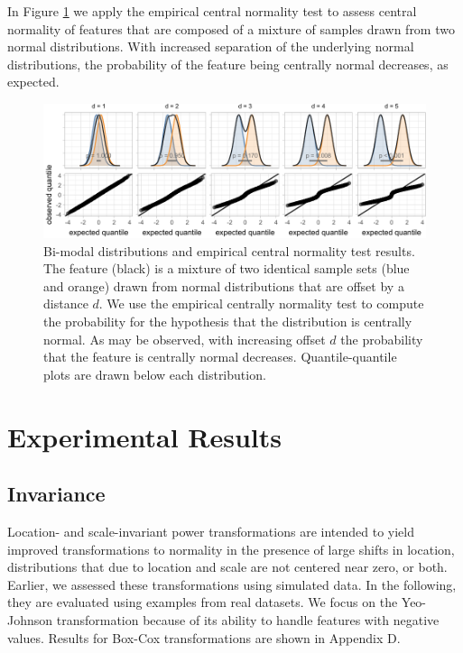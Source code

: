 \documentclass[
  a4paper,
]{article}
\begin{document}
In Figure \ref{fig:empirical-central-normality-examples} we apply the
empirical central normality test to assess central normality of features
that are composed of a mixture of samples drawn from two normal
distributions. With increased separation of the underlying normal
distributions, the probability of the feature being centrally normal
decreases, as expected.

\begin{figure}

{\centering \includegraphics{manuscript_files/figure-latex/empirical-central-normality-examples-1} 

}

\caption{Bi-modal distributions and empirical central normality test results. The feature (black) is a mixture of two identical sample sets (blue and orange) drawn from normal distributions that are offset by a distance $d$. We use the empirical centrally normality test to compute the probability for the hypothesis that the distribution is centrally normal. As may be observed, with increasing offset $d$ the probability that the feature is centrally normal decreases. Quantile-quantile plots are drawn below each distribution.}\label{fig:empirical-central-normality-examples}
\end{figure}

\section{Experimental Results}\label{experimental-results}

\subsection{Invariance}\label{invariance}

Location- and scale-invariant power transformations are intended to
yield improved transformations to normality in the presence of large
shifts in location, distributions that due to location and scale are not
centered near zero, or both. Earlier, we assessed these transformations
using simulated data. In the following, they are evaluated using
examples from real datasets. We focus on the Yeo-Johnson transformation
because of its ability to handle features with negative values. Results
for Box-Cox transformations are shown in Appendix D.
\end{document}
